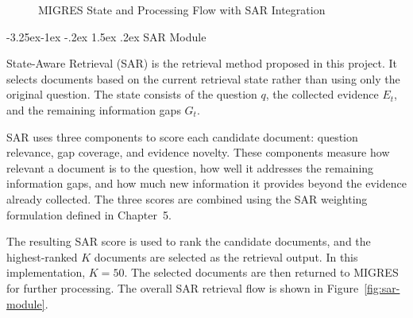 \documentclass[12pt,a4paper]{report}
\makeatletter
\renewcommand\subsection{\@startsection{subsection}{2}{\z@}%
    {-3.25ex\@plus -1ex \@minus -.2ex}%
    {1.5ex \@plus .2ex}%
    {\normalfont\fontsize{14}{17}\selectfont\bfseries}}
\makeatother
\begin{document}
\begin{figure}[H]
{%
}

\caption{MIGRES State and Processing Flow with SAR Integration}
\label{fig:migres-state-processing}
\end{figure}

\subsection{SAR Module}

State-Aware Retrieval (SAR) is the retrieval method proposed in this project. It selects documents based on the current retrieval state rather than using only the original question. The state consists of the question $q$, the collected evidence $E_t$, and the remaining information gaps $G_t$.

SAR uses three components to score each candidate document: question relevance, gap coverage, and evidence novelty. These components measure how relevant a document is to the question, how well it addresses the remaining information gaps, and how much new information it provides beyond the evidence already collected. The three scores are combined using the SAR weighting formulation defined in Chapter~5.

The resulting SAR score is used to rank the candidate documents, and the highest-ranked $K$ documents are selected as the retrieval output. In this implementation, $K=50$. The selected documents are then returned to MIGRES for further processing. The overall SAR retrieval flow is shown in Figure~\ref{fig:sar-module}.
\end{document}
